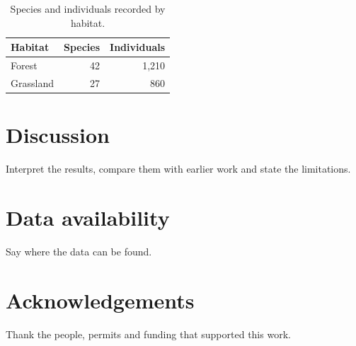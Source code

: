 \documentclass[11pt,a4paper]{article}
\begin{document}
\begin{table}[htbp]
  \centering
  \caption{Species and individuals recorded by habitat.}
  \label{tab:results}
  \begin{tabular}{lrr}
    \toprule
    Habitat & Species & Individuals \\
    \midrule
    Forest & 42 & 1{,}210 \\
    Grassland & 27 & 860 \\
    \bottomrule
  \end{tabular}
\end{table}

\section{Discussion}
Interpret the results, compare them with earlier work and state the limitations.

\section*{Data availability}
Say where the data can be found.

\section*{Acknowledgements}
Thank the people, permits and funding that supported this work.



\end{document}
